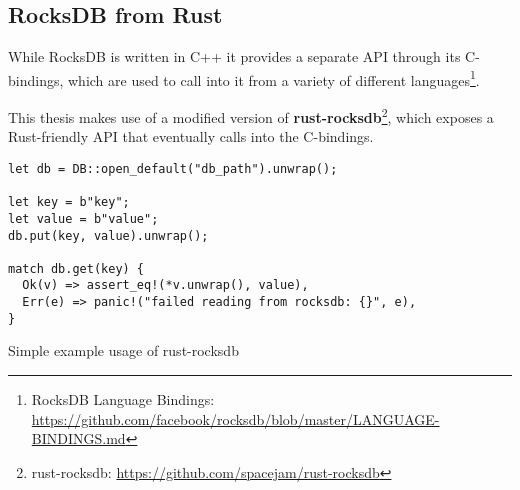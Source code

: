 
\subsection{RocksDB from Rust}
While RocksDB is written in C++ it provides a separate API through its
C-bindings, which are used to call into it from a variety of different
languages\footnote{RocksDB Language Bindings:
\url{https://github.com/facebook/rocksdb/blob/master/LANGUAGE-BINDINGS.md}}.

This thesis makes use of a modified version of
\textbf{rust-rocksdb}\footnote{rust-rocksdb: \url{https://github.com/spacejam/rust-rocksdb}}, which exposes a Rust-friendly
API that eventually calls into the C-bindings.

\begin{listing}[H]\label{lst:rocksdb-rust}
  \begin{verbatim}
let db = DB::open_default("db_path").unwrap();

let key = b"key";
let value = b"value";
db.put(key, value).unwrap();

match db.get(key) {
  Ok(v) => assert_eq!(*v.unwrap(), value),
  Err(e) => panic!("failed reading from rocksdb: {}", e),
}
  \end{verbatim}

  \caption{Simple example usage of rust-rocksdb}
\end{listing}

